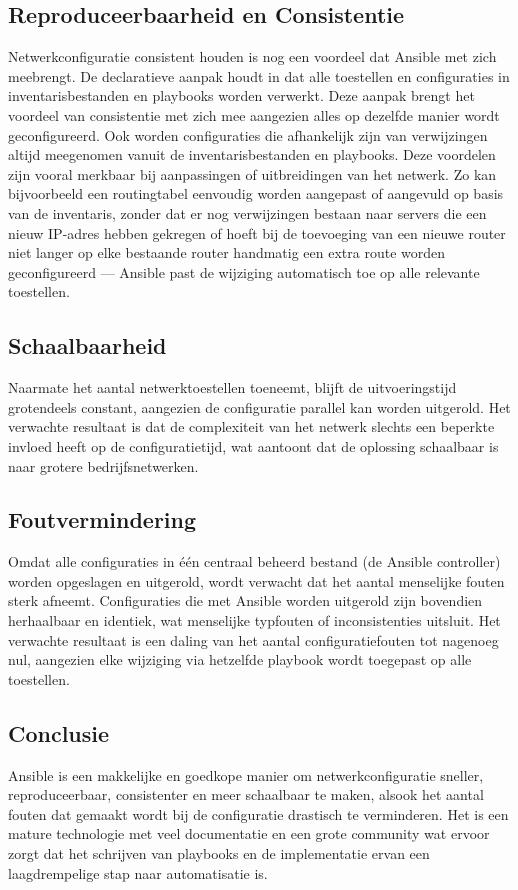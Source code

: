 \subsection{Reproduceerbaarheid en Consistentie}

Netwerkconfiguratie consistent houden is nog een voordeel dat Ansible met zich meebrengt. 
De declaratieve aanpak houdt in dat alle toestellen en configuraties in inventarisbestanden en playbooks worden verwerkt.
Deze aanpak brengt het voordeel van consistentie met zich mee aangezien alles op dezelfde manier wordt geconfigureerd.
Ook worden configuraties die afhankelijk zijn van verwijzingen altijd meegenomen vanuit de inventarisbestanden en playbooks.
Deze voordelen zijn vooral merkbaar bij aanpassingen of uitbreidingen van het netwerk.  
Zo kan bijvoorbeeld een routingtabel eenvoudig worden aangepast of aangevuld op basis van de inventaris, zonder dat er nog verwijzingen bestaan naar servers die een nieuw IP-adres hebben gekregen 
of hoeft bij de toevoeging van een nieuwe router niet langer op elke bestaande router handmatig een extra route worden geconfigureerd — Ansible past de wijziging automatisch toe op alle relevante toestellen.

\subsection{Schaalbaarheid}
Naarmate het aantal netwerktoestellen toeneemt, blijft de uitvoeringstijd grotendeels constant, aangezien de configuratie parallel kan worden uitgerold.  
Het verwachte resultaat is dat de complexiteit van het netwerk slechts een beperkte invloed heeft op de configuratietijd, wat aantoont dat de oplossing schaalbaar is naar grotere bedrijfsnetwerken.

\subsection{Foutvermindering}
Omdat alle configuraties in één centraal beheerd bestand (de Ansible controller) worden opgeslagen en uitgerold, wordt verwacht dat het aantal menselijke fouten sterk afneemt.  
Configuraties die met Ansible worden uitgerold zijn bovendien herhaalbaar en identiek, wat menselijke typfouten of inconsistenties uitsluit.  
Het verwachte resultaat is een daling van het aantal configuratiefouten tot nagenoeg nul, aangezien elke wijziging via hetzelfde playbook wordt toegepast op alle toestellen.

\subsection{Conclusie}
Ansible is een makkelijke en goedkope manier om netwerkconfiguratie sneller, reproduceerbaar, consistenter en meer schaalbaar te maken, alsook het aantal fouten dat gemaakt wordt bij de configuratie drastisch te verminderen.
Het is een mature technologie met veel documentatie en een grote community wat ervoor zorgt dat het schrijven van playbooks en de implementatie ervan een laagdrempelige stap naar automatisatie is.
